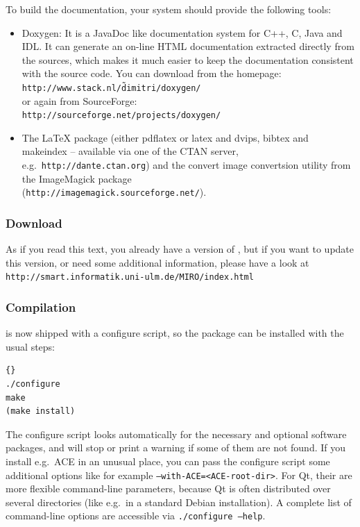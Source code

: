 \documentclass[10pt]{book}
\begin{document}
To build the documentation, your system should provide the following
tools:
\begin{itemize}
\item Doxygen: It is a JavaDoc like documentation system for C++, C,
  Java and IDL. It can generate an on-line HTML documentation
  extracted directly from the sources, which makes it much easier to
  keep the documentation consistent with the source code. You can
  download from the homepage:
  \texttt{http://www.stack.nl/\~dimitri/doxygen/}\\
  or again from SourceForge:\\
  \texttt{http://sourceforge.net/projects/doxygen/}
\item The LaTeX package (either pdflatex or latex and dvips, bibtex
  and makeindex -- available via one of the CTAN server, e.g.\ 
  \texttt{http://dante.ctan.org}) and the convert image convertsion
  utility from the ImageMagick package \\
  (\texttt{http://imagemagick.sourceforge.net/}).
\end{itemize}

\subsubsection{Download}

As if you read this text, you already have a version of \miro, but if
you want to update this version, or need some additional information,
please have a look at
\texttt{http://smart.informatik.uni-ulm.de/MIRO/index.html}

\subsubsection{Compilation}

\miro is now shipped with a configure script, so the package can be
installed with the usual steps:

\begin{lstlisting}[frame=tb]{}
./configure
make 
(make install)
\end{lstlisting}

The configure script looks automatically for the necessary and
optional software packages, and will stop or print a warning if some
of them are not found. If you install e.g.\ ACE in an unusual place,
you can pass the configure script some additional options like for
example \texttt{--with-ACE=<ACE-root-dir>}. For Qt, their are more
flexible command-line parameters, because Qt is often distributed over
several directories (like e.g.\ in a standard Debian installation). A
complete list of command-line options are accessible via
\texttt{./configure --help}.
\end{document}
